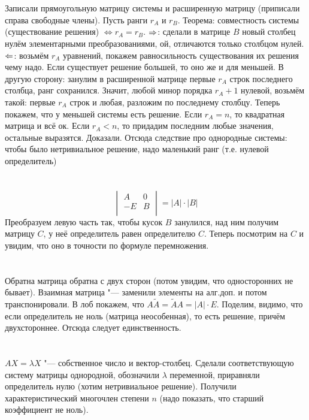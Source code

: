 \section{} %
Записали прямоугольную матрицу системы и расширенную матрицу (приписали справа свободные члены).
Пусть ранги $r_A$ и $r_B$.
Теорема: совместность системы (существование решения) $\iff r_A=r_B$.
$\Rightarrow$: сделали в матрице $B$ новый столбец нулём элементарными преобразованиями, ой, отличаются только столбцом нулей.
$\Leftarrow$: возьмём $r_A$ уравнений, покажем равносильность существования их решения чему надо.
Если существует решение большей, то оно же и для меньшей.
В другую сторону: занулим в расширенной матрице первые $r_A$ строк последнего столбца, ранг сохранился.
Значит, любой минор порядка $r_A+1$ нулевой, возьмём такой: первые $r_A$ строк и любая, разложим по последнему столбцу.
Теперь покажем, что у меньшей системы есть решение.
Если $r_A=n$, то квадратная матрица и всё ок.
Если $r_A<n$, то придадим последним любые значения, остальные выразятся.
Доказали.
Отсюда следствие про однородные системы: чтобы было нетривиальное решение, надо маленький ранг (т.е. нулевой определитель)

\section{} %
\[
\begin{vmatrix}
A & 0 \\
-E & B \\
\end{vmatrix}
= |A| \cdot |B|
\]
Преобразуем левую часть так, чтобы кусок $B$ занулился, над ним получим матрицу $C$, у неё определитель равен определителю $C$.
Теперь посмотрим на $C$ и увидим, что оно в точности по формуле перемножения.

\section{} %
Обратна матрица обратна с двух сторон (потом увидим, что односторонних не бывает).
Взаимная матрица "--- заменили элементы на алг.доп. и потом транспонировали.
В лоб покажем, что $A \tilde A = \tilde A A = |A| \cdot E$.
Поделим, видимо, что если определитель не ноль (матрица неособенная), то есть решение, причём двухстороннее.
Отсюда следует единственность.

\section{} %
$AX=\lambda X$ "--- собственное число и вектор-столбец.
Сделали соответствующую систему матрицы однородной, обозначили $\lambda$ переменной, приравняли определитель нулю (хотим нетривиальное решение).
Получили характеристический многочлен степени $n$ (надо показать, что старший коэффициент не ноль).

